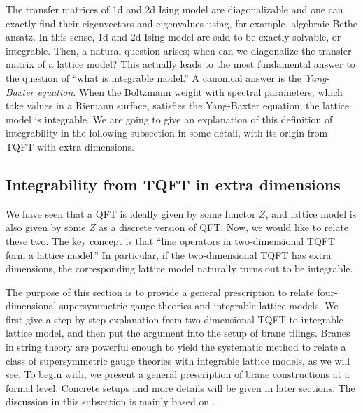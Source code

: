 The transfer matrices of 1d and 2d Ising model are diagonalizable
and one can exactly find their eigenvectors and eigenvalues using,
for example, algebraic Bethe ansatz. In this sense, 1d and 2d Ising
model are said to be exactly solvable, or integrable. Then, a natural
question arises; when can we diagonalize the transfer matrix of a
lattice model? This actually leads to the most fundamental answer
to the question of ``what is integrable model.'' A canonical answer
is the \emph{Yang-Baxter equation}. When the Boltzmann weight with spectral
parameters, which take values in a Riemann surface, satisfies the
Yang-Baxter equation, the lattice model is integrable. We are going to give
an explanation of this definition of integrability in the following subsection
in some detail, with its origin from TQFT with extra dimensions.







\subsection{Integrability from TQFT in extra dimensions}
\label{sec:integrability_from_TQFT}

We have seen that a QFT is ideally given by some functor $Z$, and
lattice model is also given by some $Z$ as a discrete version of QFT.
Now, we would like to relate these two. The key concept is that
``line operators in two-dimensional TQFT form a lattice model.''
In particular, if the two-dimensional TQFT has extra dimensions, the corresponding
lattice model naturally turns out to be integrable.


The purpose of this section is to provide a general prescription to relate four-dimensional
supersymmetric gauge theories and integrable lattice models.
We first give a step-by-step
explanation from two-dimensional TQFT to integrable lattice model,
and then put the argument into the setup of brane tilings. Branes in
string theory are powerful enough to yield the systematic method to
relate a class of supersymmetric gauge theories with integrable lattice
models, as we will see. To begin with, we present a general prescription
of brane constructions at a formal level. Concrete setups and more
details will be given in later sections.
The discussion in this subsection is mainly based on \cite{Yagi:2015lha}.







